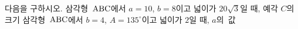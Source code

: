 다음을 구하시오.
 삼각형~$\mathrm{ABC}$에서 $a=10$, $b=8$이고 넓이가 $20\sqrt{3}$일 때, 예각 $C$의 크기
 삼각형~$\mathrm{ABC}$에서 $b=4$, $A=135^\circ$이고 넓이가 $2$일 때, \mbox{$a$의 값}
